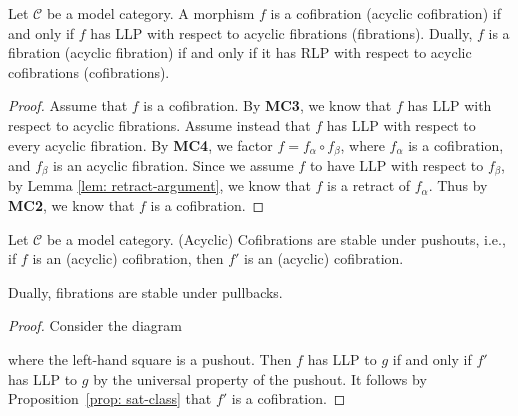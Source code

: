 \documentclass[../thesis.tex]{subfiles}
\begin{document}
            \begin{proposition}\label{prop: sat-class}
                Let $\mathcal{C}$ be a model category. A morphism $f$ is a cofibration (acyclic cofibration) if and only if $f$ has LLP with respect to acyclic fibrations (fibrations). Dually, $f$ is a fibration (acyclic fibration) if and only if it has RLP with respect to acyclic cofibrations (cofibrations).
            \end{proposition}

            \begin{proof}
            Assume that $f$ is a cofibration. By \textbf{MC3}, we know that $f$ has LLP with respect to acyclic fibrations. Assume instead that $f$ has LLP with respect to every acyclic fibration. By \textbf{MC4}, we factor $f = f_\alpha\circ f_\beta$, where $f_\alpha$ is a cofibration, and $f_\beta$ is an acyclic fibration. Since we assume $f$ to have LLP with respect to $f_\beta$, by Lemma \ref{lem: retract-argument}, we know that $f$ is a retract of $f_\alpha$. Thus by \textbf{MC2}, we know that $f$ is a cofibration. 
            \end{proof}

            \begin{corollary}\label{cor: stable-cofib-base-change}
                Let $\mathcal{C}$ be a model category. (Acyclic) Cofibrations are stable under pushouts, i.e., if $f$ is an (acyclic) cofibration, then $f'$ is an (acyclic) cofibration.
                \begin{center}
                \end{center}
                Dually, fibrations are stable under pullbacks.
            \end{corollary}

            \begin{proof}
                Consider the diagram
                \begin{center}
                \end{center}
                where the left-hand square is a pushout. Then $f$ has LLP to $g$ if and only if $f'$ has LLP to $g$ by the universal property of the pushout. It follows by Proposition~\ref{prop: sat-class} that $f'$ is a cofibration.
            \end{proof}
\end{document}

